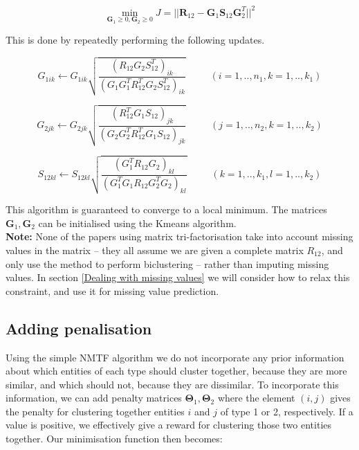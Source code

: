 \documentclass{article}
\begin{document}
			\begin{equation}
				\min_{ \boldsymbol G_1 \ge 0, \boldsymbol G_2 \ge 0 } J = { || \boldsymbol R_{12} - \boldsymbol G_1 \boldsymbol S_{12} \boldsymbol G_2^T ||^2 }
			\end{equation}
			
			\noindent This is done by repeatedly performing the following updates.
			
			\begin{equation}
				G_{1ik} \leftarrow G_{1ik} \sqrt{ \displaystyle \frac{ (R_{12} G_2 S_{12}^T)_{ik} }{ (G_1 G_1^T R_{12}^T G_2 S_{12}^T)_{ik} } } 
				\hspace{30pt} ( i=1,..,n_1, k=1,..,k_1 ) 
			\end{equation}
			
			\begin{equation}
				G_{2jk} \leftarrow G_{2jk} \sqrt{ \displaystyle \frac{ (R_{12}^T G_1 S_{12})_{jk} }{ (G_2 G_2^T R_{12}^T G_1 S_{12})_{jk} } } 
				\hspace{30pt} ( j=1,..,n_2, k=1,..,k_2 ) 
			\end{equation}
			
			\begin{equation}
				S_{12kl} \leftarrow S_{12kl} \sqrt{ \displaystyle \frac{ (G_1^T R_{12} G_2)_{kl} }{ (G_1 ^T G_1 R_{12} G_2^T G_2)_{kl} } } 
				\hspace{30pt} ( k=1,..,k_1, l=1,..,k_2 ) 
			\end{equation}
			
			\noindent This algorithm is guaranteed to converge to a local minimum. The matrices \( \boldsymbol G_1, \boldsymbol G_2 \) can be initialised using the Kmeans algorithm. \\
			
			\noindent \textbf{Note:} None of the papers using matrix tri-factorisation take into account missing values in the matrix -- they all assume we are given a complete matrix \( R_{12} \), and only use the method to perform biclustering -- rather than imputing missing values. In section \ref{Dealing with missing values} we will consider how to relax this constraint, and use it for missing value prediction.
			
		\subsection{Adding penalisation}
			Using the simple NMTF algorithm we do not incorporate any prior information about which entities of each type should cluster together, because they are more similar, and which should not, because they are dissimilar. To incorporate this information, we can add penalty matrices \( \boldsymbol \Theta_1, \boldsymbol \Theta_2 \) where the element \( (i,j) \) gives the penalty for clustering together entities \( i \) and \( j \) of type 1 or 2, respectively. If a value is positive, we effectively give a reward for clustering those two entities together. Our minimisation function then becomes:
			
\end{document}
